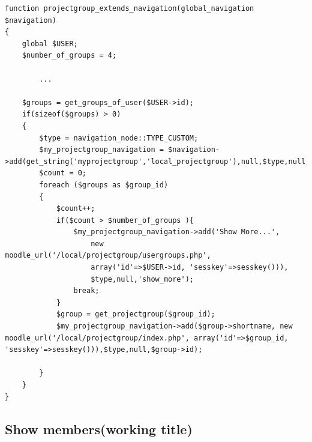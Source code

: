 \begin{lstlisting}[style=phpCode, caption=\myCaption{The code for extending the navigation}, label=src:moodlecodeextendingnavigation]
function projectgroup_extends_navigation(global_navigation $navigation) 
{
	global $USER;
	$number_of_groups = 4;
	
		...
	
	$groups = get_groups_of_user($USER->id);
	if(sizeof($groups) > 0)
	{
		$type = navigation_node::TYPE_CUSTOM;
		$my_projectgroup_navigation = $navigation->add(get_string('myprojectgroup','local_projectgroup'),null,$type,null,'myprojectgroup');
		$count = 0;
		foreach ($groups as $group_id) 
		{
			$count++;
			if($count > $number_of_groups ){
				$my_projectgroup_navigation->add('Show More...', 
					new moodle_url('/local/projectgroup/usergroups.php',
					array('id'=>$USER->id, 'sesskey'=>sesskey())),
					$type,null,'show_more');
				break;
			}
			$group = get_projectgroup($group_id);
			$my_projectgroup_navigation->add($group->shortname, new moodle_url('/local/projectgroup/index.php', array('id'=>$group_id, 'sesskey'=>sesskey())),$type,null,$group->id);
			
		}
	}
}
\end{lstlisting}


\subsection{Show members(working title)}
\label{sub:membersblock}















